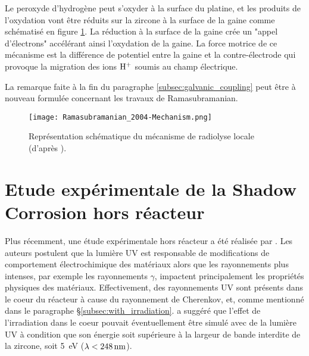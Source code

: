 \begin{refsection}
    Le peroxyde d’hydrogène peut s’oxyder à la surface du platine, et les produits de l’oxydation vont être réduits sur
    la zircone à la surface de la gaine comme schématisé en figure \ref{fig:ramasubramanian_mechanism}. La réduction à
    la surface de la gaine crée un "appel d’électrons" accélérant ainsi l’oxydation de la gaine. La force motrice de ce
    mécanisme est la différence de potentiel entre la gaine et la contre-électrode qui provoque la migration des ions
    $\rm H^+$ soumis au champ électrique.

    La remarque faite à la fin du paragraphe \ref{subsec:galvanic_coupling} peut être à nouveau
    formulée concernant les travaux de Ramasubramanian.

    \begin{figure}[H] 
 		\centering 
 		\texttt{[image: Ramasubramanian\_2004-Mechanism.png]}
        \caption[Représentation schématique du mécanisme de radiolyse locale.]
        {Représentation schématique du mécanisme de radiolyse locale (d'après \citet{Ramasubramanian2004}).} 
 		\label{fig:ramasubramanian_mechanism} 
 	\end{figure}

       

	
\section{Etude expérimentale de la Shadow Corrosion hors réacteur}\label{sec:out_of_pile_experiments}

    Plus récemment, une étude expérimentale hors réacteur a été réalisée par
    \citet{Kim2010}. Les auteurs postulent que la lumière UV est responsable de
    modifications de comportement électrochimique des matériaux alors que les
    rayonnements plus intenses, par exemple les rayonnements $\gamma$, impactent
    principalement les propriétés physiques des matériaux. Effectivement, des rayonnements UV sont
    présents dans le coeur du réacteur à cause du rayonnement de Cherenkov, et, 
    comme mentionné dans le paragraphe \S\ref{subsec:with_irradiation}. \citet{Cox1989} a suggéré que l’effet de l’irradiation
    dans le coeur pouvait éventuellement être simulé avec de la lumière UV à condition que
    son énergie soit supérieure à la largeur de bande interdite de la zircone, soit \SI{5}{\electronvolt} ($\rm \lambda <
    \SI{248}{\nano\meter}$). 


\end{refsection}
